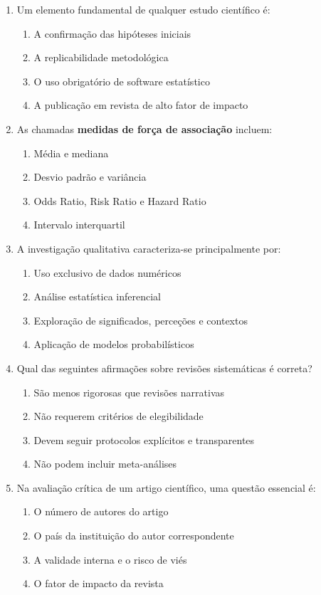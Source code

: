 \documentclass[12pt,a4paper]{article}
\begin{document}
\begin{enumerate}[label=\textbf{Q\arabic*.}]
\item Um elemento fundamental de qualquer estudo científico é:
\begin{enumerate}[label=\alph*)]
\item A confirmação das hipóteses iniciais  
\item A replicabilidade metodológica  
\item O uso obrigatório de software estatístico  
\item A publicação em revista de alto fator de impacto  
\end{enumerate}

\item As chamadas \textbf{medidas de força de associação} incluem:
\begin{enumerate}[label=\alph*)]
\item Média e mediana  
\item Desvio padrão e variância  
\item Odds Ratio, Risk Ratio e Hazard Ratio  
\item Intervalo interquartil  
\end{enumerate}

\item A investigação qualitativa caracteriza-se principalmente por:
\begin{enumerate}[label=\alph*)]
\item Uso exclusivo de dados numéricos  
\item Análise estatística inferencial  
\item Exploração de significados, perceções e contextos  
\item Aplicação de modelos probabilísticos  
\end{enumerate}

\item Qual das seguintes afirmações sobre revisões sistemáticas é correta?
\begin{enumerate}[label=\alph*)]
\item São menos rigorosas que revisões narrativas  
\item Não requerem critérios de elegibilidade  
\item Devem seguir protocolos explícitos e transparentes  
\item Não podem incluir meta-análises  
\end{enumerate}

\item Na avaliação crítica de um artigo científico, uma questão essencial é:
\begin{enumerate}[label=\alph*)]
\item O número de autores do artigo  
\item O país da instituição do autor correspondente  
\item A validade interna e o risco de viés  
\item O fator de impacto da revista  
\end{enumerate}


\end{enumerate}
\end{document}
